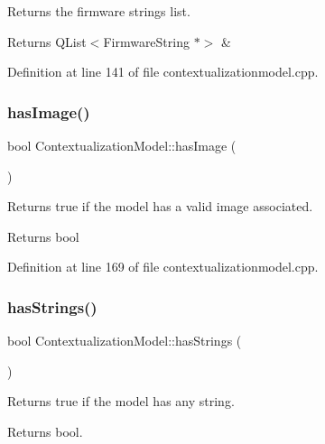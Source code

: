 Returns the firmware strings list. 

\begin{DoxyReturn}{Returns}
Q\+List$<$\+Firmware\+String $\ast$$>$ \& 
\end{DoxyReturn}


Definition at line 141 of file contextualizationmodel.\+cpp.

\mbox{\label{classContextualizationModel_a47cf0c1ba3e6a86f264c501c9fb7e4e5}} 
\subsubsection{\texorpdfstring{has\+Image()}{hasImage()}}
{\footnotesize\ttfamily bool Contextualization\+Model\+::has\+Image (\begin{DoxyParamCaption}{ }\end{DoxyParamCaption})}



Returns true if the model has a valid image associated. 

\begin{DoxyReturn}{Returns}
bool 
\end{DoxyReturn}


Definition at line 169 of file contextualizationmodel.\+cpp.

\mbox{\label{classContextualizationModel_a369461aa31404ea4ff1c04fc2bd21f92}} 
\subsubsection{\texorpdfstring{has\+Strings()}{hasStrings()}}
{\footnotesize\ttfamily bool Contextualization\+Model\+::has\+Strings (\begin{DoxyParamCaption}{ }\end{DoxyParamCaption})}



Returns true if the model has any string. 

\begin{DoxyReturn}{Returns}
bool. 
\end{DoxyReturn}


